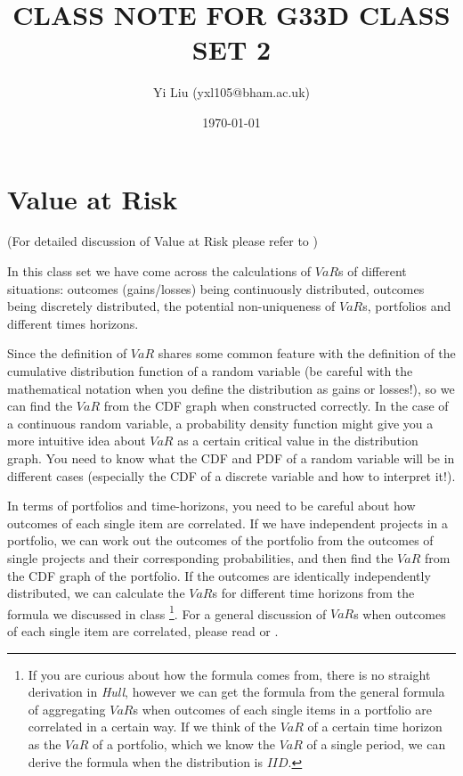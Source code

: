 \documentclass[12pt]{article}
\author{Yi Liu (yxl105@bham.ac.uk)}
\date{\today}
\title{CLASS NOTE FOR G33D CLASS SET 2}
\begin{document}
\maketitle

\section{Value at Risk}

(For detailed discussion of Value at Risk please refer to
\citet[Chap.9]{hull2012risk})

In this class set we have come across the calculations of $ VaR $s of different situations:
outcomes (gains/losses) being continuously distributed, outcomes being discretely distributed, the potential non-uniqueness of $ VaR $s, portfolios and different times horizons.

Since the definition of $ VaR $ shares some common feature with the definition of the cumulative distribution function of a random variable (be careful with the mathematical notation when you define the distribution as gains or losses!), so we can find the $ VaR $ from the CDF graph when constructed correctly.
In the case of a continuous random variable, a probability density function might give you a more intuitive idea about $ VaR $ as a certain critical value in the distribution graph.
You need to know what the CDF and PDF of a random variable will be in different cases (especially the CDF of a discrete variable and how to interpret it!).

In terms of portfolios and time-horizons, you need to be careful about how outcomes of each single item are correlated.
If we have independent projects in a portfolio, we can work out the outcomes of the portfolio from the outcomes of single projects and their corresponding probabilities, and then find the $ VaR $ from the CDF graph of the portfolio. If the outcomes are identically independently distributed, we
can calculate the $ VaR $s for different time horizons from the formula we discussed in class%
\footnote{
  If you are curious about how the formula comes from, there is no straight
  derivation in \textit{Hull}, however we can get the formula from the general formula of aggregating $ VaR $s \citet[pp. 187]{hull2012risk} when outcomes of each single items in a portfolio are correlated in a certain way.
  If we think of the $ VaR $ of a certain time horizon as the $ VaR $ of a portfolio, which we know the $ VaR $ of a single period, we can derive the formula when the distribution is $ IID $.
}.
For a general discussion of $ VaR $s when outcomes of each single item are correlated, please read
\citet[Chap.9, pp.187]{hull2012risk}
or
\citet[pp.200]{MatthewsThompson2008Banking}%
.



\end{document}
